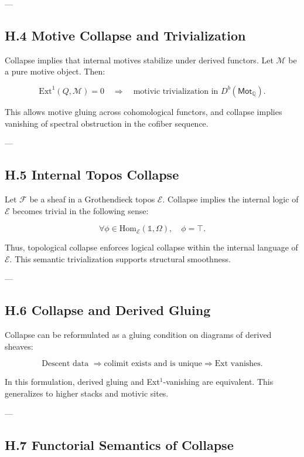 \documentclass[11pt]{article}
\begin{document}
---

\subsection*{H.4 Motive Collapse and Trivialization}

Collapse implies that internal motives stabilize under derived functors.  
Let $\mathcal{M}$ be a pure motive object. Then:

\[
\mathrm{Ext}^1(Q, \mathcal{M}) = 0 \quad \Rightarrow \quad 
\text{motivic trivialization in } D^b(\mathsf{Mot}_\mathbb{Q}).
\]

This allows motive gluing across cohomological functors, and collapse implies vanishing of spectral obstruction in the cofiber sequence.

---

\subsection*{H.5 Internal Topos Collapse}

Let $\mathcal{F}$ be a sheaf in a Grothendieck topos $\mathcal{E}$.  
Collapse implies the internal logic of $\mathcal{E}$ becomes trivial in the following sense:

\[
\forall \phi \in \mathrm{Hom}_\mathcal{E}(\mathbb{1}, \Omega), \quad \phi = \top.
\]

Thus, topological collapse enforces logical collapse within the internal language of $\mathcal{E}$.  
This semantic trivialization supports structural smoothness.

---

\subsection*{H.6 Collapse and Derived Gluing}

Collapse can be reformulated as a gluing condition on diagrams of derived sheaves:

\[
\text{Descent data } \Rightarrow \text{colimit exists and is unique} \Rightarrow \text{Ext vanishes}.
\]

In this formulation, derived gluing and Ext$^1$-vanishing are equivalent.  
This generalizes to higher stacks and motivic sites.

---

\subsection*{H.7 Functorial Semantics of Collapse}
\end{document}
